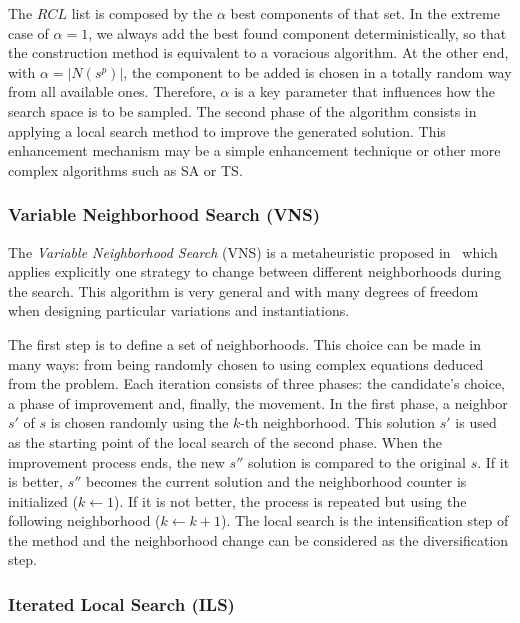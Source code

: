 The $RCL$ list is composed by the $\alpha$ best components of that set. In the extreme case of $\alpha = 1$, we always add the best found component deterministically, so that the construction method is equivalent to a voracious algorithm. At the other end, with $\alpha = |N(s^p)|$, the component to be added is chosen in a totally random way from all available ones. Therefore, $\alpha$ is a key parameter that influences how the search space is to be sampled. The second phase of the algorithm consists in applying a local search method to improve the generated solution. This enhancement mechanism may be a simple enhancement technique or other more complex algorithms such as SA or TS.

\subsubsection{Variable Neighborhood Search (VNS)}

The \emph{Variable Neighborhood	Search} (VNS) is a metaheuristic proposed in~\cite{mladenovic97variable} which applies explicitly one strategy to change between different neighborhoods during the search. This algorithm is very general and with many degrees of freedom when designing particular variations and instantiations.

The first step is to define a set of neighborhoods. This choice can be made in many ways: from being randomly chosen to using complex equations deduced from the problem. Each iteration consists of three phases: the candidate's choice, a phase of improvement and, finally, the movement. In the first phase, a neighbor $s'$ of $s$ is chosen randomly using the $k$-th neighborhood. This solution $s'$ is used as the starting point of the local search of the second phase. When the improvement process ends, the new $s''$ solution is compared to the original $s$. If it is better, $s''$ becomes the current solution and the neighborhood counter is initialized ($k \leftarrow 1$). If it is not better, the process is repeated but using the following neighborhood ($ k \leftarrow k+1 $). The local search is the intensification step of the method and the neighborhood change can be considered as the diversification step.

\subsubsection{Iterated Local Search (ILS)}

